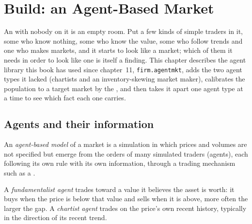 \chapter{Build: an Agent-Based Market}\label{ch:mx:build-an-agent-based-market}

An  with nobody on it is an empty room. Put a few kinds of simple traders in it, some who know nothing, some who know the value, some
who follow trends and one who makes markets, and it starts to look like a market; which of them it needs in order to look like one is itself a finding.
This chapter describes the agent library this book has used since chapter~11, \texttt{firm.agentmkt}, adds the two agent types it lacked (chartists and
an inventory-skewing market maker), calibrates the population to a target market by the , and then takes it apart one agent
type at a time to see which fact each one carries.

\section{Agents and their information}

\begin{definition}\label{def:mx:build-an-agent-based-market:abm}
An \emph{agent-based model} of a market is a simulation in which prices and volumes are not specified but emerge from the
orders of many simulated traders (agents), each following its own rule with its own information, through a trading mechanism such as a .
\end{definition}

\begin{definition}\label{def:mx:build-an-agent-based-market:types}
A \emph{fundamentalist agent} trades toward a value it believes the asset is worth: it buys when the price is below that
value and sells when it is above, more often the larger the gap. A \emph{chartist agent} trades on the price's own recent
history, typically in the direction of its recent trend.
\end{definition}

